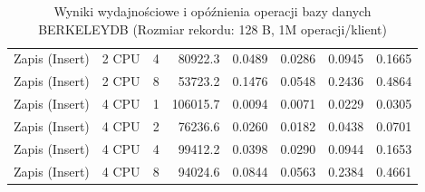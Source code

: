 \begin{table}[ht]
{\begin{tabular}{llcrrrrr}
Zapis (Insert) & 2 CPU & 4 & 80922.3 & 0.0489 & 0.0286 & 0.0945 & 0.1665 \\
Zapis (Insert) & 2 CPU & 8 & 53723.2 & 0.1476 & 0.0548 & 0.2436 & 0.4864 \\
Zapis (Insert) & 4 CPU & 1 & 106015.7 & 0.0094 & 0.0071 & 0.0229 & 0.0305 \\
Zapis (Insert) & 4 CPU & 2 & 76236.6 & 0.0260 & 0.0182 & 0.0438 & 0.0701 \\
Zapis (Insert) & 4 CPU & 4 & 99412.2 & 0.0398 & 0.0290 & 0.0944 & 0.1653 \\
Zapis (Insert) & 4 CPU & 8 & 94024.6 & 0.0844 & 0.0563 & 0.2384 & 0.4661 \\
\bottomrule
\end{tabular}%
}
\caption{Wyniki wydajnościowe i opóźnienia operacji bazy danych BERKELEYDB (Rozmiar rekordu: 128 B, 1M operacji/klient)}
\label{tab:latency_berkeleydb_small_1000000}
\end{table}
